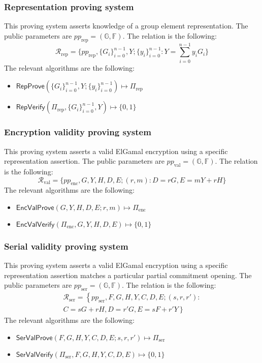 \documentclass{llncs}
\newcommand{\G}{\mathbb{G}}
\newcommand{\F}{\mathbb{F}}
\newcommand{\func}[1]{\mathsf{#1}}
\begin{document}
\subsubsection{Representation proving system}

This proving system asserts knowledge of a group element representation.
The public parameters are $pp_{\text{rep}} = (\G, \F)$.
The relation is the following:
\[ \mathcal{R}_{\text{rep}} = \{ pp_{\text{rep}}, \{G_i\}_{i=0}^{n-1}, Y ; \{y_i\}_{i=0}^{n-1} : Y = \sum_{i=0}^{n-1} y_i G_i \} \]
The relevant algorithms are the following:
\begin{itemize}
    \item $\func{RepProve}(\{G_i\}_{i=0}^{n-1}, Y ; \{y_i\}_{i=0}^{n-1}) \mapsto \Pi_{\text{rep}}$
    \item $\func{RepVerify}(\Pi_{\text{rep}}, \{G_i\}_{i=0}^{n-1}, Y) \mapsto \{0, 1\}$
\end{itemize}


\subsubsection{Encryption validity proving system}

This proving system asserts a valid ElGamal encryption using a specific representation assertion.
The public parameters are $pp_{\text{val}} = (\G, \F)$.
The relation is the following:
\[ \mathcal{R}_{\text{val}} = \{ pp_{\text{enc}}, G, Y, H, D, E ; (r, m) : D = rG, E = mY + rH \} \]
The relevant algorithms are the following:
\begin{itemize}
    \item $\func{EncValProve}(G, Y, H, D, E ; r, m) \mapsto \Pi_{\text{enc}}$
    \item $\func{EncValVerify}(\Pi_{\text{enc}}, G, Y, H, D, E) \mapsto \{0, 1\}$
\end{itemize}


\subsubsection{Serial validity proving system}

This proving system asserts a valid ElGamal encryption using a specific representation assertion matches a particular partial commitment opening.
The public parameters are $pp_{\text{ser}} = (\G, \F)$.
The relation is the following:
\begin{multline*}
\mathcal{R}_{\text{ser}} = \left\{ pp_{\text{ser}}, F, G, H, Y, C, D, E ; (s, r, r') : \right. \\
\left. C = sG + rH, D = r'G, E = sF + r'Y \right\}
\end{multline*}
The relevant algorithms are the following:
\begin{itemize}
    \item $\func{SerValProve}(F, G, H, Y, C, D, E ; s, r, r') \mapsto \Pi_{\text{ser}}$
    \item $\func{SerValVerify}(\Pi_{\text{ser}}, F, G, H, Y, C, D, E) \mapsto \{0, 1\}$
\end{itemize}
\end{document}
